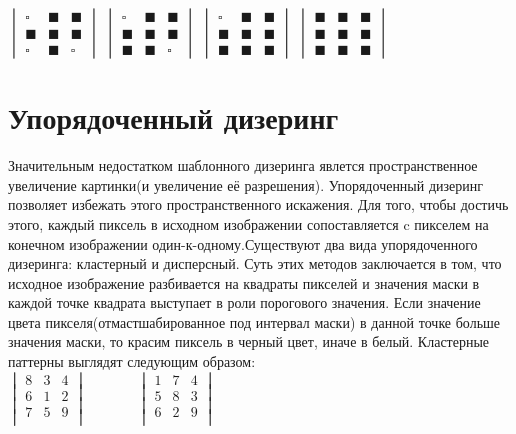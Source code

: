 $\begin{vmatrix}
\square&\blacksquare&\blacksquare \\
\blacksquare &\blacksquare&\blacksquare \\
\square &\blacksquare&\square 
\end{vmatrix}$ 
$\begin{vmatrix}
\square&\blacksquare&\blacksquare \\
\blacksquare &\blacksquare&\blacksquare \\
\blacksquare &\blacksquare&\square 
\end{vmatrix}$ 	 
$\begin{vmatrix}
\square&\blacksquare&\blacksquare \\
\blacksquare &\blacksquare&\blacksquare \\
\blacksquare &\blacksquare&\blacksquare 
\end{vmatrix}$ 
$\begin{vmatrix}
\blacksquare&\blacksquare&\blacksquare \\
\blacksquare &\blacksquare&\blacksquare \\
\blacksquare &\blacksquare&\blacksquare 
\end{vmatrix}$ 


\section{Упорядоченный дизеринг}
Значительным недостатком шаблонного дизеринга явлется пространственное увеличение картинки(и увеличение её разрешения). Упорядоченный дизеринг позволяет избежать этого пространственного искажения. Для того, чтобы достичь этого, каждый пиксель в исходном изображении   сопоставляется c пикселем на конечном изображении  один-к-одному.Существуют два вида упорядоченного дизеринга: кластерный и дисперсный.
Суть этих методов заключается в том, что  исходное изображение разбивается на квадраты пикселей и значения маски в каждой точке квадрата выступает в роли порогового значения. Если значение цвета пикселя(отмастшабированное под интервал маски) в данной точке больше значения маски, то красим пиксель в черный цвет, иначе в белый. Кластерные паттерны выглядят следующим образом:\\
$\begin{vmatrix}
8&  3 & 4  \\                      
6&  1&  2   \\                 
7 & 5 & 9  \\
\end{vmatrix}    $   ~    ~  ~  ~        
$\begin{vmatrix}
1 &  7 & 4 \\
5 & 8 & 3 \\
6 & 2 & 9 \\
\end{vmatrix}$

